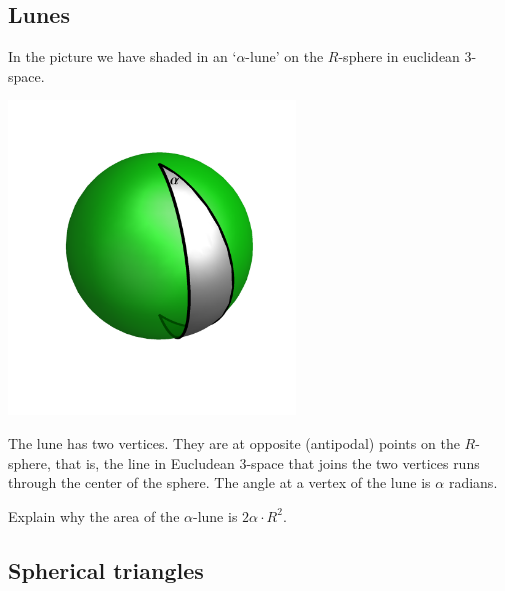 

\subsection*{Lunes}

In the picture we have shaded in an `$\alpha$-lune' on the $R$-sphere in
euclidean $3$-space.%
\begin{image}
\includegraphics[width=3in]{W13_3.png}%
\end{image}


The lune has two vertices. They are at opposite (antipodal) points on the
$R$-sphere, that is, the line in Eucludean $3$-space that joins the two
vertices runs through the center of the sphere. The angle at a vertex of the
lune is $\alpha$ radians.

\begin{exercise}
\label{67} Explain why the area of the $\alpha$-lune is $2\alpha
\cdot R^{2}$.
\end{exercise}


\subsection*{Spherical triangles}


